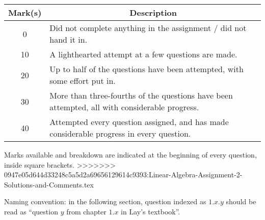 \documentclass[answers,11pt]{exam}
\theoremstyle{definition}
\theoremstyle{definition}
\DeclareMathOperator{\1}{\mathbbm{1}}
\begin{document}
\begin{questions}
\begin{solution}
	\begin{center}
		\begin{tabular}{c | p{9cm}}
			\textbf{Mark(s)} & \multicolumn{1}{c}{\textbf{Description}} \\
			\hline
			0 & Did not complete anything in the assignment / did not hand it in. \\
			\hline
			10 & A lighthearted attempt at a few questions are made. \\
			\hline
			20 & Up to half of the questions have been attempted, with some effort put in. \\
			\hline
			30 & More than three-fourths of the questions have been attempted, all with considerable progress. \\
			\hline
			40 & Attempted every question assigned, and has made considerable progress in every question.
		\end{tabular}
	\end{center}
	
%	
%	
%	
	
	\item Marks available and breakdown are indicated at the beginning of every question, inside square brackets. 
>>>>>>> 0947e05d644d33248c5a5d2a69656129614c9393:Linear-Algebra-Assignment-2-Solutions-and-Comments.tex
	
	\item Naming convention: in the following section, question indexed as $1.x.y$ should be read as ``question $y$ from chapter $1.x$ in Lay's textbook''.
	

\end{solution}
\end{questions}
\end{document}
